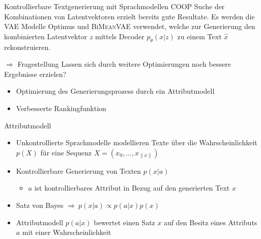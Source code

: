 

\begin{frame}{Kontrollierbare Textgenerierung mit Sprachmodellen}
  COOP Suche der Kombinationen von Latentvektoren erzielt bereits gute Resultate.
  Es werden die VAE Modelle Optimus und \textsc{BiMeanVAE} verwendet, welche zur Generierung den kombinierten Latentvektor $z$ mittels Decoder $p_\theta(x|z)$ zu einem Text $\hat{x}$ rekonstruieren.

  \begin{block}{$\Rightarrow$ Fragestellung}
    Lassen sich durch weitere Optimierungen noch bessere Ergebnisse erzielen?
  \end{block}

  \begin{itemize}
    \item Optimierung des Generierungsprozess durch ein Attributmodell
    \item Verbesserte Rankingfunktion
  \end{itemize}
\end{frame}

\begin{frame}{Attributmodell}
  \begin{itemize}
    \item Unkontrollierte Sprachmodelle modellieren Texte über die Wahrscheinlichkeit $p(X)$ für eine Sequenz $X=(x_0,...,x_{\| x \|})$
    \item Kontrollierbare Generierung von Texten $p(x|a)$ \begin{itemize} \item $a$ ist kontrollierbares Attribut in Bezug auf den generierten Text $x$ \end{itemize}
    \item Satz von Bayes  $ \Rightarrow \  p(x|a)\propto p(a|x)p(x)$ 
    \item Attributmodell $p(a|x)$ bewertet einen Satz $x$ auf den Besitz eines Attributs $a$ mit einer Wahrscheinlichkeit
  \end{itemize}
\end{frame}

